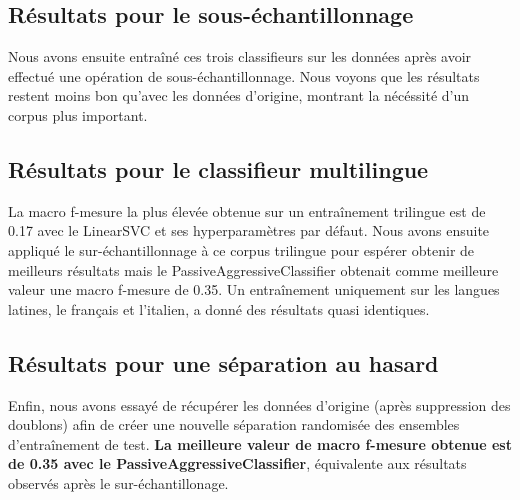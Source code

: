 \documentclass[11pt]{article}
\begin{document}
\subsection{Résultats pour le sous-échantillonnage}
Nous avons ensuite entraîné ces trois classifieurs sur les données après avoir effectué une opération de sous-échantillonnage. Nous voyons que les résultats restent moins bon qu'avec les données d'origine, montrant la nécéssité d'un corpus plus important. 

\begin{table}[ht]
\centering
{}
\caption{Meilleurs résultats obtenus après sous-échantillonnage.}

\label{tab:pourcentage_test}
\end{table}


\subsection{Résultats pour le classifieur multilingue}

La macro f-mesure la plus élevée obtenue sur un entraînement trilingue est de 0.17 avec le LinearSVC et ses hyperparamètres par défaut. Nous avons ensuite appliqué le sur-échantillonnage à ce corpus trilingue pour espérer obtenir de meilleurs résultats mais le PassiveAggressiveClassifier obtenait comme meilleure valeur une macro f-mesure de 0.35. Un entraînement uniquement sur les langues latines, le français et l'italien, a donné des résultats quasi identiques.

\subsection{Résultats pour une séparation au hasard}

Enfin, nous avons essayé de récupérer les données d'origine (après suppression des doublons) afin de créer une nouvelle séparation randomisée des ensembles d'entraînement de test.
\textbf{La meilleure valeur de macro f-mesure obtenue est de 0.35 avec le PassiveAggressiveClassifier}, équivalente aux résultats observés après le sur-échantillonage. 
\end{document}
